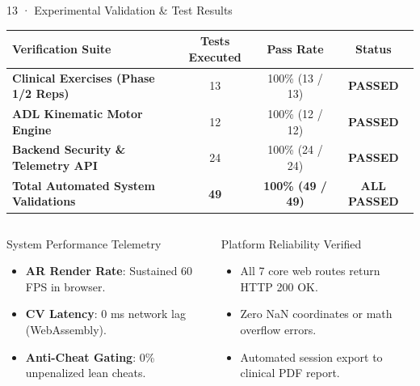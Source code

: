 \documentclass[aspectratio=169,11pt]{beamer}
\begin{document}
\begin{frame}{13 · Experimental Validation \& Test Results}
\vspace{-2mm}
\centering
\setlength{\tabcolsep}{6pt}
\small
\renewcommand{\arraystretch}{1.10}
\begin{tabular}{lccc}
\toprule
\textbf{\textcolor{DarkForest}{Verification Suite}} & 
\textbf{\textcolor{DarkForest}{Tests Executed}} & 
\textbf{\textcolor{DarkForest}{Pass Rate}} & 
\textbf{\textcolor{DarkForest}{Status}} \\
\midrule
\textbf{Clinical Exercises (Phase 1/2 Reps)} & 13 & 100\% (13 / 13) & \textbf{PASSED} \\
\textbf{ADL Kinematic Motor Engine} & 12 & 100\% (12 / 12) & \textbf{PASSED} \\
\textbf{Backend Security \& Telemetry API} & 24 & 100\% (24 / 24) & \textbf{PASSED} \\
\midrule
\textbf{Total Automated System Validations} & \textbf{49} & \textbf{100\% (49 / 49)} & \textbf{ALL PASSED} \\
\bottomrule
\end{tabular}

\vspace{2mm}
\begin{columns}[T]
\begin{block}{System Performance Telemetry}
\begin{itemize}
    \item \textbf{AR Render Rate}: Sustained 60 FPS in browser.
    \item \textbf{CV Latency}: 0 ms network lag (WebAssembly).
    \item \textbf{Anti-Cheat Gating}: 0\% unpenalized lean cheats.
\end{itemize}
\end{block}

\begin{block}{Platform Reliability Verified}
\begin{itemize}
    \item All 7 core web routes return HTTP 200 OK.
    \item Zero NaN coordinates or math overflow errors.
    \item Automated session export to clinical PDF report.
\end{itemize}
\end{block}
\end{columns}
\end{frame}
\end{document}
